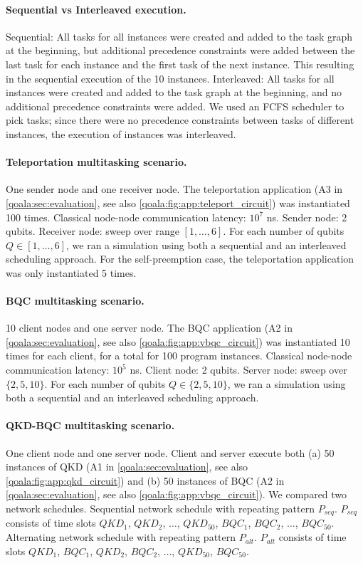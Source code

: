 \paragraph{Sequential vs Interleaved execution.}
Sequential: All tasks for all instances were created and added to the task graph at the beginning, but additional precedence constraints were added between the last task for each instance and the first task of the next instance. This resulting in the sequential execution of the 10 instances.
Interleaved: All tasks for all instances were created and added to the task graph at the beginning, and no additional precedence constraints were added. We used an FCFS scheduler to pick tasks; since there were no precedence constraints between tasks of different instances, the execution of instances was interleaved.

\paragraph{Teleportation multitasking scenario.}
One sender node and one receiver node.
The teleportation application (A3 in \cref{qoala:sec:evaluation}, see also \cref{qoala:fig:app:teleport_circuit}) was instantiated 100 times.
Classical node-node communication latency: $10^7$ ns.
Sender node: 2 qubits.
Receiver node: sweep over range $[1, \dots, 6]$.
For each number of qubits $Q \in [1, \dots, 6]$, we ran a simulation using both a sequential and an interleaved scheduling approach.
For the self-preemption case, the teleportation application was only instantiated 5 times.

\paragraph{BQC multitasking scenario.}
10 client nodes and one server node.
The BQC application (A2 in \cref{qoala:sec:evaluation}, see also \cref{qoala:fig:app:vbqc_circuit}) was instantiated 10 times for each client, for a total for 100 program instances.
Classical node-node communication latency: $10^5$ ns.
Client node: 2 qubits.
Server node: sweep over $\{2, 5, 10\}$.
For each number of qubits $Q \in \{2, 5, 10\}$, we ran a simulation using both a sequential and an interleaved scheduling approach.

\paragraph{QKD-BQC multitasking scenario.}
One client node and one server node.
Client and server execute both (a) 50 instances of QKD (A1 in \cref{qoala:sec:evaluation}, see also \cref{qoala:fig:app:qkd_circuit}) and (b) 50 instances of BQC (A2 in \cref{qoala:sec:evaluation}, see also \cref{qoala:fig:app:vbqc_circuit}).
We compared two network schedules.
Sequential network schedule with repeating pattern $P_{seq}$. $P_{seq}$ consists of time slots $QKD_1$, $QKD_2$, $\dots$, $QKD_{50}$, $BQC_1$, $BQC_2$, $\dots$, $BQC_{50}$.
Alternating network schedule with repeating pattern $P_{alt}$. $P_{alt}$ consists of time slots $QKD_1$, $BQC_1$, $QKD_2$, $BQC_2$, $\dots$, $QKD_{50}$, $BQC_{50}$.

